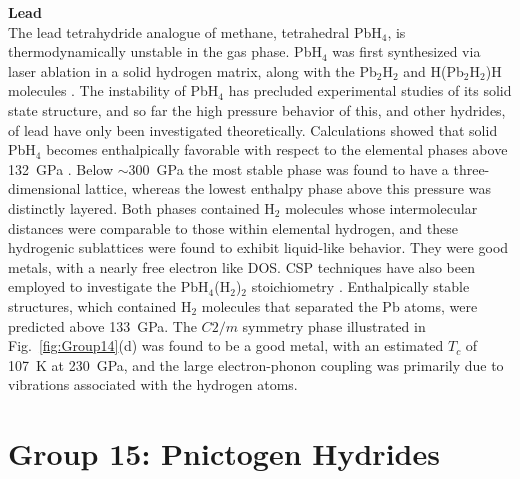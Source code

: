 \documentclass[12pt,letterpaper,oneside]{article}
\begin{document}
\noindent\textbf{Lead} \\ 
%
The lead tetrahydride analogue of methane, tetrahedral PbH$_4$, is thermodynamically unstable in the gas phase. PbH$_4$ was first synthesized via laser ablation in a solid hydrogen matrix, along with the Pb$_2$H$_2$ and H(Pb$_2$H$_2$)H molecules \cite{Wang:2003-Pb}. The instability of PbH$_4$ has precluded experimental studies of its solid state structure, and so far the high pressure behavior of this, and other hydrides, of lead have only been investigated theoretically. Calculations showed that solid PbH$_4$ becomes enthalpically favorable with respect to the elemental phases above 132~GPa \cite{Zaleski-Ejgierd:2011a}. Below $\sim$300~GPa the most stable phase was found to have a three-dimensional lattice, whereas the lowest enthalpy phase above this pressure was distinctly layered. Both phases contained H$_2$ molecules whose intermolecular distances were comparable to those within elemental hydrogen, and these hydrogenic sublattices were found to exhibit liquid-like behavior. They were good metals, with a nearly free electron like DOS. CSP techniques have also been employed to investigate the PbH$_4$(H$_2$)$_2$ stoichiometry \cite{Cheng:2015}.  Enthalpically stable structures, which contained H$_2$ molecules that separated the Pb atoms, were predicted above 133~GPa. The $C2/m$ symmetry phase illustrated in Fig.\ \ref{fig:Group14}(d) was found to be a good metal, with an estimated $T_c$ of 107~K at 230~GPa, and the large electron-phonon coupling was primarily due to vibrations associated with the hydrogen atoms. 



\section{Group 15: Pnictogen Hydrides} 
\end{document}
